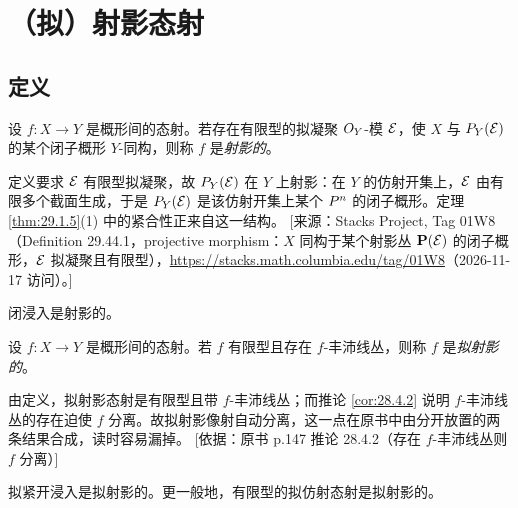 
\section{（拟）射影态射}\label{sec:29}

\subsection{定义}\label{sec:29.1}

\begin{definition}\label{def:29.1.1}
设 $f\colon X\to Y$ 是概形间的态射。若存在有限型的拟凝聚 $O_Y$-模 $\mathcal{E}$，使 $X$ 与 $P_Y(\mathcal{E})$ 的某个闭子概形 $Y$-同构，则称 $f$ 是\emph{射影的}。
\end{definition}

\begin{yizhu}
定义要求 $\mathcal{E}$ 有限型拟凝聚，故 $P_Y(\mathcal{E})$ 在 $Y$ 上射影：在 $Y$ 的仿射开集上，$\mathcal{E}$ 由有限多个截面生成，于是 $P_Y(\mathcal{E})$ 是该仿射开集上某个 $P^n$ 的闭子概形。定理 \ref{thm:29.1.5}(1) 中的紧合性正来自这一结构。
[来源：Stacks Project, Tag 01W8（Definition 29.44.1，projective morphism：$X$ 同构于某个射影丛 $\mathbf P(\mathcal{E})$ 的闭子概形，$\mathcal{E}$ 拟凝聚且有限型），\url{https://stacks.math.columbia.edu/tag/01W8}（2026-11-17 访问）。]
\end{yizhu}

\begin{example}\label{ex:29.1.2}
闭浸入是射影的。
\end{example}

\begin{definition}\label{def:29.1.3}
设 $f\colon X\to Y$ 是概形间的态射。若 $f$ 有限型且存在 $f$-丰沛线丛，则称 $f$ 是\emph{拟射影的}。
\end{definition}

\begin{yizhu}
由定义，拟射影态射是有限型且带 $f$-丰沛线丛；而推论 \ref{cor:28.4.2} 说明 $f$-丰沛线丛的存在迫使 $f$ 分离。故拟射影像射自动分离，这一点在原书中由分开放置的两条结果合成，读时容易漏掉。
[依据：原书 p.147 推论 28.4.2（存在 $f$-丰沛线丛则 $f$ 分离）]
\end{yizhu}

\begin{example}\label{ex:29.1.4}
拟紧开浸入是拟射影的。更一般地，有限型的拟仿射态射是拟射影的。
\end{example}

